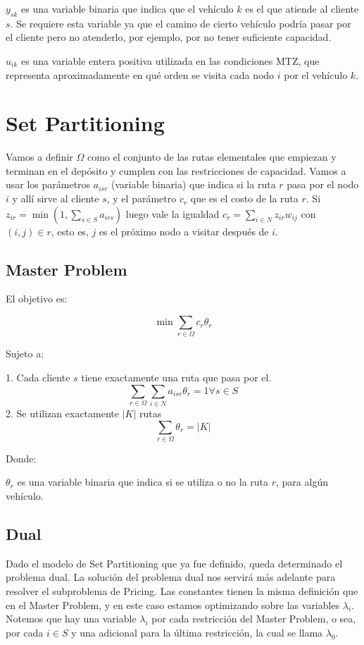 $y_{sk}$ es una variable binaria que indica que el vehículo $k$ es el que atiende al cliente $s$. Se requiere esta variable ya que el camino de cierto vehículo podría pasar por el cliente pero no atenderlo, por ejemplo, por no tener suficiente capacidad.

$u_{ik}$ es una variable entera positiva utilizada en las condiciones MTZ, que representa aproximadamente en qué orden se visita cada nodo $i$ por el vehículo $k$.

\section{Set Partitioning}

Vamos a definir $\Omega$ como el conjunto de las rutas elementales que empiezan y terminan en el depósito y cumplen con las restricciones de capacidad. Vamos a usar los parámetros $a_{isr}$ (variable binaria) que indica si la ruta $r$ pasa por el nodo $i$ y allí sirve al cliente $s$, y el parámetro $c_r$ que es el costo de la ruta $r$. Si $z_{ir} = \min(1, \sum_{s \in S}{a_{irs}})$ luego vale la igualdad $c_r = \sum_{i \in N}{z_{ir} w_{ij}}$ con $(i, j) \in r$, esto es, $j$ es el próximo nodo a visitar después de $i$.

\subsection{Master Problem}

El objetivo es:

\[\min \sum_{r \in \Omega} c_r  \theta_r\]

Sujeto a:

1. Cada cliente $s$ tiene exactamente una ruta que pasa por el.  
\[
\sum_{r \in \Omega}\sum_{i \in N}{a_{isr}\theta_r} = 1
\forall {s \in S}
\]
2. Se utilizan exactamente $|K|$ rutas
\[
\sum_{r \in \Omega}{\theta_r} = |K|
\]

Donde:

$\theta_r$ es una variable binaria que indica si se utiliza o no la ruta $r$, para algún vehículo.

\subsection{Dual}

Dado el modelo de Set Partitioning que ya fue definido, queda determinado el problema dual. La solución del problema dual nos servirá más adelante para resolver el subproblema de Pricing. Las constantes tienen la misma definición que en el Master Problem, y en este caso estamos optimizando sobre las variables $\lambda_i$. Notemos que hay una variable $\lambda_i$ por cada restricción del Master Problem, o sea, por cada $i \in S$ y una adicional para la última restricción, la cual se llama $\lambda_0$. 

